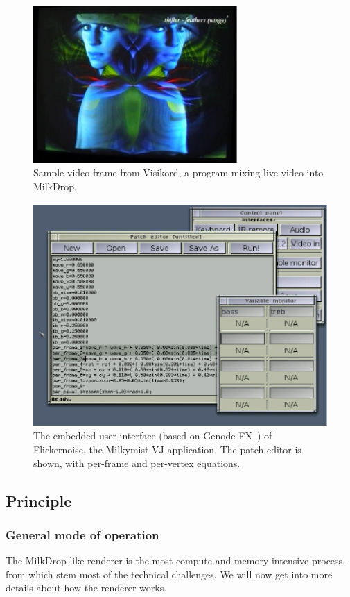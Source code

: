\documentclass[a4paper,11pt]{kthesis}
\begin{document}
\begin{figure}[htp]
\centering
\includegraphics[height=60mm]{visikord.eps}
\caption{Sample video frame from Visikord, a program mixing live video into MilkDrop.}
\label{fig:visikord}
\end{figure}

\begin{figure}[htp]
\centering
\includegraphics[height=85mm]{flickernoise.eps}
\caption{The embedded user interface (based on Genode FX~\cite{genodefx}) of Flickernoise, the Milkymist VJ application. The patch editor is shown, with per-frame and per-vertex equations.}
\label{fig:flickernoise}
\end{figure}

\subsection{Principle}
\subsubsection{General mode of operation}
The MilkDrop-like renderer is the most compute and memory intensive process, from which stem most of the technical challenges. We will now get into more details about how the renderer works.
\end{document}
